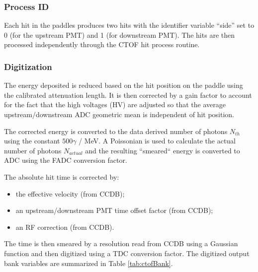 \subsubsection{Process ID}

Each hit in the paddles produces two hits with the identifier variable ``side'' set to 0 (for the upstream PMT) and 1 (for downstream PMT).
The hits are then processed independently through the CTOF hit process routine.

\subsubsection{Digitization}

The energy deposited is reduced based on the hit position on the paddle using the calibrated attenuation length.
It is then corrected by a gain factor to account for the fact that the high voltages (HV) are adjusted so that
the average upstream/downstream ADC geometric mean is independent of hit position.

The corrected energy is converted to the data derived number of photons $N_{th}$ using the constant $500 \gamma$ / MeV. A Poissonian is used to
calculate the actual number of photons $N_{actual}$ and the resulting ``smeared`` energy is converted to ADC using the FADC conversion factor.


The absolute hit time is corrected by:

\begin{itemize}
	\item the effective velocity (from CCDB);
	\item an upstream/downstream PMT time offset factor (from CCDB);
	\item an RF correction (from CCDB).
\end{itemize}

The time is then smeared by a resolution read from CCDB using a Gaussian function and then digitized using a TDC conversion factor.
The digitized output bank variables are summarized in Table \ref{tab:ctofBank}.

